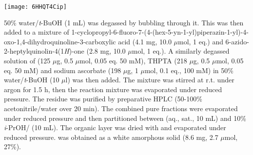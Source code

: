 	\begin{scheme}[H]
		\begin{center}
			\texttt{[image: 6HHQT4Cip]}
		\end{center}
	\end{scheme}
	

50\% water/\textit{t}-BuOH (1 mL) was degassed by bubbling  through it. This was then added to a mixture of 1-cyclopropyl-6-fluoro-7-(4-(hex-5-yn-1-yl)piperazin-1-yl)-4-oxo-1,4\hyp{}dihydro\-quinoline-3-carboxylic acid  (4.1 mg, 10.0 $\mu$mol, 1 eq.) and 6-azido-2-heptylquinolin-4(1\textit{H})-one  (2.8 mg, 10.0 $\mu$mol, 1 eq.).
A similarly degassed solution of  (125 $\mu$g, 0.5 $\mu$mol, 0.05 eq. 50 mM), THPTA (218 $\mu$g, 0.5 $\mu$mol, 0.05 eq. 50 mM) and sodium ascorbate (198 $\mu$g, 1 $\mu$mol, 0.1 eq., 100 mM) in 50\% water/\textit{t}-BuOH (10 $\mu$l) was then added. 
The mixture was stirred at r.t. under argon for 1.5 h, then the reaction mixture was evaporated under reduced pressure. The residue was purified by preparative HPLC (50-100\% acetonitrile/water over 20 min).
The combined pure fractions were evaporated under reduced pressure and then partitioned between  (aq., sat., 10 mL) and 10\% \textit{i}-PrOH/ (10 mL). The organic layer was dried with  and evaporated under reduced pressure.
 was obtained as a white amorphous solid (8.6 mg, 2.7 $\mu$mol, 27\%). %
\\[1\baselineskip]
\\[1\baselineskip]
